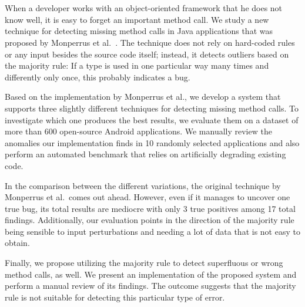 \chapter{\abstractname}

When a developer works with an object-oriented framework that he does not know well, it is easy to forget an important method call.
We study a new technique for detecting missing method calls in Java applications that was proposed by Monperrus et al.~\cite{monperrus2010detecting}.
The technique does not rely on hard-coded rules or any input besides the source code itself; instead, it detects outliers based on the majority rule:
If a type is used in one particular way many times and differently only once, this probably indicates a bug.

Based on the implementation by Monperrus et al., we develop a system that supports three slightly different techniques for detecting missing method calls.
To investigate which one produces the best results, we evaluate them on a dataset of more than 600 open-source Android applications.
We manually review the anomalies our implementation finds in 10 randomly selected applications and also perform an automated benchmark that relies on artificially degrading existing code.

In the comparison between the different variations, the original technique by Monperrus et al.\ comes out ahead.
However, even if it manages to uncover one true bug, its total results are mediocre with only 3 true positives among 17 total findings.
Additionally, our evaluation points in the direction of the majority rule being sensible to input perturbations and needing a lot of data that is not easy to obtain.

Finally, we propose utilizing the majority rule to detect superfluous or wrong method calls, as well.
We present an implementation of the proposed system and perform a manual review of its findings.
The outcome suggests that the majority rule is not suitable for detecting this particular type of error.

